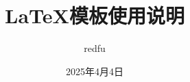 \documentclass[unicode,master]{scutthesis} %
\begin{document}
\title{LaTeX模板使用说明}
\author{redfu}
\date{2025年4月4日}
\maketitle
\frontmatter	%
\tableofcontents	%

\begingroup
\renewcommand*{\addvspace}[1]{}
\newcommand{\loflabel}{图}
\renewcommand{\numberline}[1]{\loflabel~#1\hspace*{1em}}
\listoffigures

\newcommand{\lotlabel}{表}
\renewcommand{\numberline}[1]{\lotlabel~#1\hspace*{1em}}
\listoftables
\endgroup


\mainmatter %

\pagestyle{fancy}	%

\end{document}
